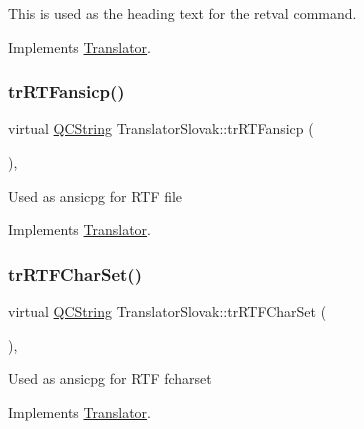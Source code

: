 This is used as the heading text for the retval command. 

Implements \mbox{\hyperlink{class_translator}{Translator}}.

\mbox{\label{class_translator_slovak_ad48c87b2afa2b7c2f2f532d37a55b8a5}} 
\subsubsection{\texorpdfstring{trRTFansicp()}{trRTFansicp()}}
{\footnotesize\ttfamily virtual \mbox{\hyperlink{class_q_c_string}{Q\+C\+String}} Translator\+Slovak\+::tr\+R\+T\+Fansicp (\begin{DoxyParamCaption}{ }\end{DoxyParamCaption})\hspace{0.3cm}{\ttfamily [inline]}, {\ttfamily [virtual]}}

Used as ansicpg for R\+TF file 

Implements \mbox{\hyperlink{class_translator_a9953a4c0e6a4fc7d017abcd5c2939e0f}{Translator}}.

\mbox{\label{class_translator_slovak_a3e52c6d85346a640161541af78759b92}} 
\subsubsection{\texorpdfstring{trRTFCharSet()}{trRTFCharSet()}}
{\footnotesize\ttfamily virtual \mbox{\hyperlink{class_q_c_string}{Q\+C\+String}} Translator\+Slovak\+::tr\+R\+T\+F\+Char\+Set (\begin{DoxyParamCaption}{ }\end{DoxyParamCaption})\hspace{0.3cm}{\ttfamily [inline]}, {\ttfamily [virtual]}}

Used as ansicpg for R\+TF fcharset 

Implements \mbox{\hyperlink{class_translator_afad391f3cbfb5ce6332b7239f8e2049a}{Translator}}.

\mbox{\label{class_translator_slovak_a96db154011fd367bd7c18c967de05753}} 
